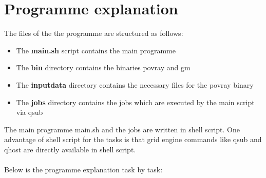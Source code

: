 \documentclass{article}
\begin{document}


\section{Programme explanation}
The files of the the programme are structured as follows:

\begin{itemize}
\item The \textbf{main.sh} script contains the main programme
\item The \textbf{bin} directory contains the binaries povray and gm
\item The \textbf{inputdata} directory contains the necessary files for the povray binary
\item The \textbf{jobs} directory contains the jobs which are executed by the main script via qsub
\end{itemize}

The main programme main.sh and the jobs are written in shell script. One advantage of shell script for the tasks is that grid engine commands like qsub and qhost are directly available in shell script.
\\
\\
Below is the programme explanation task by task:
\end{document}
